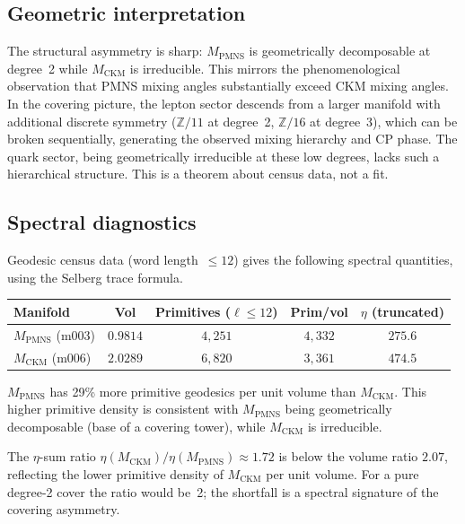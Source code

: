 \documentclass[12pt]{article}
\theoremstyle{definition}
\begin{document}
\subsection{Geometric interpretation}

The structural asymmetry is sharp: $M_\text{PMNS}$ is geometrically
decomposable at degree~2 while $M_\text{CKM}$ is irreducible.
This mirrors the phenomenological observation that PMNS mixing angles
substantially exceed CKM mixing angles.
In the covering picture, the lepton sector descends from a larger
manifold with additional discrete symmetry ($\mathbb{Z}/11$ at
degree~2, $\mathbb{Z}/16$ at degree~3), which can be broken
sequentially, generating the observed mixing hierarchy and CP phase.
The quark sector, being geometrically irreducible at these low degrees,
lacks such a hierarchical structure. This is a theorem about census
data, not a fit.

\subsection{Spectral diagnostics}
\label{subsec:spectral_covering}

Geodesic census data (word length~$\leq 12$) gives the following
spectral quantities, using the Selberg trace formula.

\begin{center}\small
\begin{tabular}{lcccc}
\toprule
Manifold & Vol & Primitives ($\ell\leq 12$) & Prim/vol & $\eta$ (truncated) \\
\midrule
$M_\text{PMNS}$ (m003) & $0.9814$ & $4{,}251$ & $4{,}332$ & $275.6$ \\
$M_\text{CKM}$  (m006) & $2.0289$ & $6{,}820$ & $3{,}361$ & $474.5$ \\
\bottomrule
\end{tabular}
\end{center}

$M_\text{PMNS}$ has 29\% more primitive geodesics per unit volume than
$M_\text{CKM}$. This higher primitive density is consistent with
$M_\text{PMNS}$ being geometrically decomposable (base of a covering
tower), while $M_\text{CKM}$ is irreducible.

The $\eta$-sum ratio $\eta(M_\text{CKM})/\eta(M_\text{PMNS})\approx 1.72$
is below the volume ratio $2.07$, reflecting the lower primitive density
of $M_\text{CKM}$ per unit volume. For a pure degree-2 cover the ratio
would be~2; the shortfall is a spectral signature of the covering
asymmetry.
\end{document}
